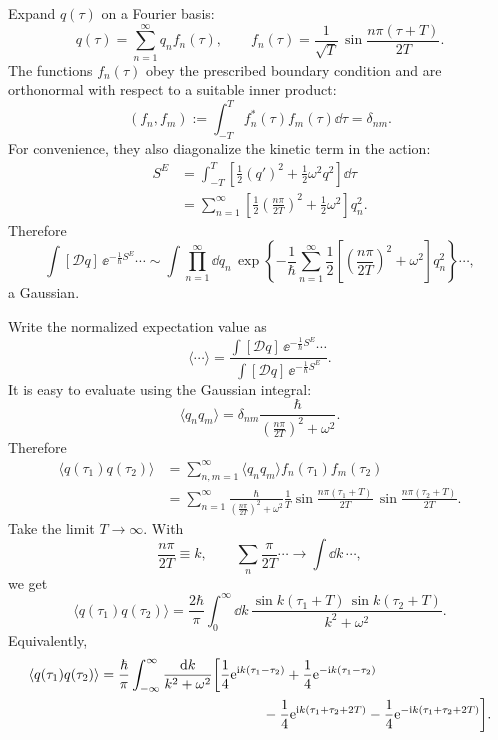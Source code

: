 Expand $q(\tau)$ on a Fourier basis:
\[
  q(\tau)=\sum_{n=1}^\infty q_n f_n(\tau),
  \qquad
  f_n(\tau)=\frac{1}{\sqrt{T}}\,
  \sin\frac{n\pi(\tau+T)}{2T}.
\]
The functions $f_n(\tau)$ obey the prescribed boundary condition and are
orthonormal with respect to a suitable inner product:
\[
  (f_n,f_m)
  :=
  \int_{-T}^{T}f_n^*(\tau)f_m(\tau)\dd\tau
  =
  \delta_{nm}.
\]
For convenience, they also diagonalize the kinetic term in the action:
\[
\begin{aligned}
  S^E
  &=
  \int_{-T}^{T}
  \left[
    \frac12(q')^2+\frac12\omega^2q^2
  \right]\dd\tau
  \\
  &=
  \sum_{n=1}^{\infty}
  \left[
    \frac12\left(\frac{n\pi}{2T}\right)^2
    +
    \frac12\omega^2
  \right]q_n^2.
\end{aligned}
\]
Therefore
\[
  \int[\mathcal Dq]\,\ee^{-\frac{1}{\hbar}S^E}\cdots
  \sim
  \int \prod_{n=1}^{\infty}\dd q_n\,
  \exp\left\{
    -\frac{1}{\hbar}
    \sum_{n=1}^{\infty}
    \frac12
    \left[
      \left(\frac{n\pi}{2T}\right)^2+\omega^2
    \right]q_n^2
  \right\}
  \cdots,
\]
a Gaussian.

Write the normalized expectation value as
\[
  \langle \cdots\rangle
  =
  \frac{\int[\mathcal Dq]\,\ee^{-\frac{1}{\hbar}S^E}\cdots}
       {\int[\mathcal Dq]\,\ee^{-\frac{1}{\hbar}S^E}}.
\]
It is easy to evaluate using the Gaussian integral:
\[
  \langle q_n q_m\rangle
  =
  \delta_{nm}
  \frac{\hbar}{\left(\frac{n\pi}{2T}\right)^2+\omega^2}.
\]
Therefore
\[
\begin{aligned}
  \langle q(\tau_1)q(\tau_2)\rangle
  &=
  \sum_{n,m=1}^{\infty}
  \langle q_nq_m\rangle f_n(\tau_1)f_m(\tau_2)
  \\
  &=
  \sum_{n=1}^{\infty}
  \frac{\hbar}{\left(\frac{n\pi}{2T}\right)^2+\omega^2}
  \frac{1}{T}
  \sin\frac{n\pi(\tau_1+T)}{2T}\,
  \sin\frac{n\pi(\tau_2+T)}{2T}.
\end{aligned}
\]
Take the limit $T\to\infty$. With
\[
  \frac{n\pi}{2T}\equiv k,
  \qquad
  \sum_n\frac{\pi}{2T}\cdots\longrightarrow\int\dd k\,\cdots,
\]
we get
\[
  \langle q(\tau_1)q(\tau_2)\rangle
  =
  \frac{2\hbar}{\pi}
  \int_0^\infty\dd k\,
  \frac{
    \sin k(\tau_1+T)\,\sin k(\tau_2+T)
  }{k^2+\omega^2}.
\]
Equivalently,
\[
\begin{aligned}
  \langle q(\tau_1)q(\tau_2)\rangle
  &=
  \frac{\hbar}{\pi}
  \int_{-\infty}^{\infty}
  \frac{\dd k}{k^2+\omega^2}
  \biggl[
    \frac14\ee^{\ii k(\tau_1-\tau_2)}
    +\frac14\ee^{-\ii k(\tau_1-\tau_2)}
    \\
    &\hspace{4.1cm}
    -\frac14\ee^{\ii k(\tau_1+\tau_2+2T)}
    -\frac14\ee^{-\ii k(\tau_1+\tau_2+2T)}
  \biggr].
\end{aligned}
\]

